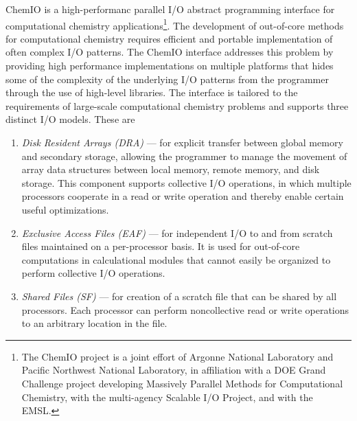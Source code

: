 \label{sec:ChemIO}


ChemIO is a high-performanc parallel I/O abstract programming interface for
computational chemistry applications\footnote{The ChemIO project is a joint effort of
Argonne National Laboratory and Pacific Northwest National Laboratory, in affiliation
with a DOE Grand Challenge project developing Massively Parallel Methods for
Computational Chemistry, with the multi-agency Scalable I/O Project, and with
the EMSL.}.
The development of out-of-core methods for 
computational chemistry requires efficient and portable implementation of often complex 
I/O patterns.  The ChemIO interface addresses this problem by providing high
performance implementations on multiple platforms that hides some of the
complexity of the underlying I/O patterns from the programmer through the use of
high-level libraries.  The interface is tailored to the requirements of
large-scale computational chemistry problems and supports three distinct
I/O models.  These are

\begin{enumerate}
\item {\em Disk Resident Arrays (DRA)} --- for explicit transfer between global
memory and secondary storage, allowing the programmer to manage the movement of array
data structures between local memory, remote memory, and disk storage.  This component
supports collective I/O operations, in which multiple processors cooperate in 
a read or write operation and thereby enable certain useful optimizations.

\item {\em Exclusive Access Files (EAF)} --- for independent I/O to and from
scratch files maintained on a per-processor basis.  It is used for out-of-core
computations in calculational modules that cannot easily be organized to perform collective I/O
operations.

\item {\em Shared Files (SF)} --- for creation of a scratch file that can be
shared by all processors.  Each processor can perform noncollective read or write
operations to an arbitrary location in the file.

\end{enumerate}


